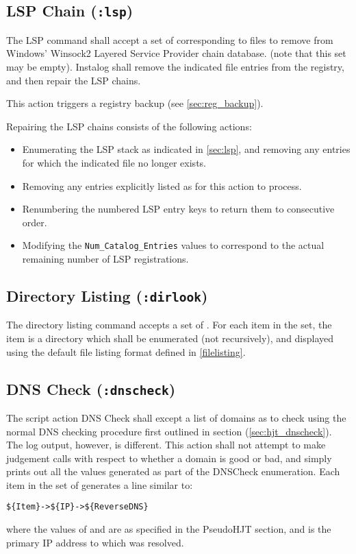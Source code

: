 \subsection{LSP Chain (\texttt{:lsp})}
The LSP command shall accept a set of  corresponding to files to
remove from Windows' Winsock2 Layered Service Provider chain database. (note
that this set may be empty). Instalog shall remove the indicated file entries
from the registry, and then repair the LSP chains.

This action triggers a registry backup (see \ref{sec:reg_backup}).

Repairing the LSP chains consists of the following actions:
\begin{itemize}
    \item Enumerating the LSP stack as indicated in \ref{sec:lsp}, and removing
    any entries for which the indicated file no longer exists.
    \item Removing any entries explicitly listed as  for this action
    to process.
    \item Renumbering the numbered LSP entry keys to return them to consecutive
    order.
    \item Modifying the \verb|Num_Catalog_Entries| values to correspond to the
    actual remaining number of LSP registrations.
\end{itemize}

\subsection{Directory Listing (\texttt{:dirlook})}
The directory listing command accepts a set of . For each item in the
set, the item is a directory which shall be enumerated (not recursively), and
displayed using the default file listing format defined in \ref{filelisting}.

\subsection{DNS Check (\texttt{:dnscheck})}
The script action DNS Check shall except a list of domains as  to
check using the normal DNS checking procedure first outlined in section
(\ref{sec:hjt_dnscheck}). The log output, however, is different. This action
shall not attempt to make judgement calls with respect to whether a domain is
good or bad, and simply prints out all the values generated as part of the
DNSCheck enumeration. Each item in the set of  generates a line
similar to:
\begin{verbatim}
${Item}->${IP}->${ReverseDNS}
\end{verbatim}
where the values of  and  are as specified in the
PseudoHJT section, and  is the primary IP address to which 
was resolved.
